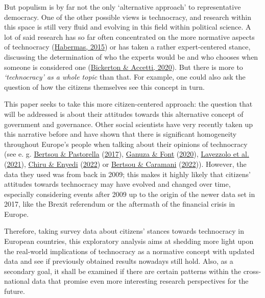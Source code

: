 \documentclass[
  12pt,
  english,
]{article}
\begin{document}
But populism is by far not the only `alternative approach' to
representative democracy. One of the other possible views is
technocracy, and research within this space is still very fluid and
evolving in this field within political science. A lot of said research
has so far often concentrated on the more normative aspects of
technocracy (\protect\hyperlink{ref-habermas2015lure}{Habermas, 2015})
or has taken a rather expert-centered stance, discussing the
determination of who the experts would be and who chooses when someone
is considered one
(\protect\hyperlink{ref-bickerton2020technocracy}{Bickerton \& Accetti,
2020}). But there is more to \emph{`technocracy' as a whole topic} than
that. For example, one could also ask the question of how the citizens
themselves see this concept in turn.

This paper seeks to take this more citizen-centered approach: the
question that will be addressed is about their attitudes towards this
alternative concept of government and governance. Other social
scientists have very recently taken up this narrative before and have
shown that there is significant homogeneity throughout Europe's people
when talking about their opinions of technocracy (see e. g.
\protect\hyperlink{ref-bertsou2017technocratic}{Bertsou \& Pastorella}
(\protect\hyperlink{ref-bertsou2017technocratic}{2017}),
\protect\hyperlink{ref-ganuza2020experts}{Ganuza \& Font}
(\protect\hyperlink{ref-ganuza2020experts}{2020}),
\protect\hyperlink{ref-lavezzolo2021will}{Lavezzolo et al.}
(\protect\hyperlink{ref-lavezzolo2021will}{2021}),
\protect\hyperlink{ref-chiru2022wants}{Chiru \& Enyedi}
(\protect\hyperlink{ref-chiru2022wants}{2022}) or
\protect\hyperlink{ref-bertsou2022people}{Bertsou \& Caramani}
(\protect\hyperlink{ref-bertsou2022people}{2022})). However, the data
they used was from back in 2009; this makes it highly likely that
citizens' attitudes towards technocracy may have evolved and changed
over time, especially considering events after 2009 up to the origin of
the newer data set in 2017, like the Brexit referendum or the aftermath
of the financial crisis in Europe.

Therefore, taking survey data about citizens' stances towards
technocracy in European countries, this exploratory analysis aims at
shedding more light upon the real-world implications of technocracy as a
normative concept with updated data and see if previously obtained
results nowadays still hold. Also, as a secondary goal, it shall be
examined if there are certain patterns within the cross-national data
that promise even more interesting research perspectives for the future.
\end{document}
